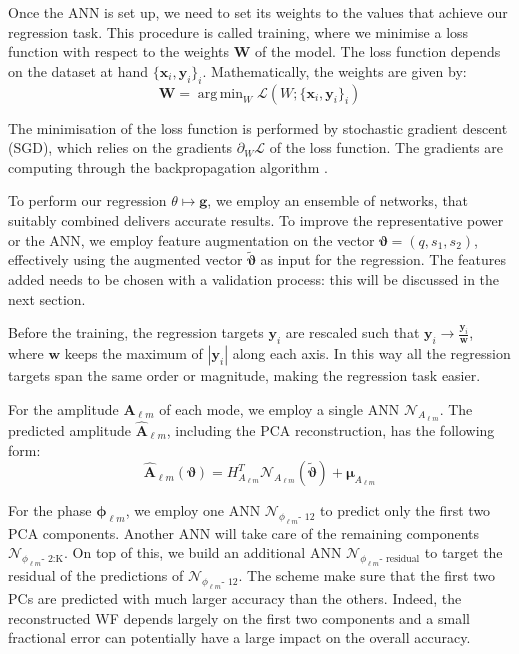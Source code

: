 \documentclass[twocolumn,showpacs,preprintnumbers,nofootinbib,prd,
superscriptaddress,10pt]{revtex4-1}
\DeclareMathOperator*{\argmin}{arg\,min}
\begin{document}
Once the ANN is set up, we need to set its weights to the values that achieve our regression task.
This procedure is called training, where we minimise a loss function with respect to the weights $\boldsymbol{W}$ of the model.
The loss function depends on the dataset at hand ${\{\boldsymbol{x}_i, \boldsymbol{y}_i\}_i}$.
Mathematically, the weights are given by:
%
\begin{equation}\label{eq:loss_general}
	\boldsymbol{W} = \argmin_W \mathcal{L}(W; \{\boldsymbol{x}_i, \boldsymbol{y}_i\}_i)
\end{equation}

The minimisation of the loss function is performed by stochastic gradient descent (SGD), which relies on the gradients $\partial_W \mathcal{L}$ of the loss function. The gradients are computing through the backpropagation algorithm \cite{}.

To perform our regression $\theta \longmapsto \boldsymbol{g}$, we employ an ensemble of networks, that suitably combined delivers accurate results.
To improve the representative power or the ANN, we employ feature augmentation on the vector $\boldsymbol{\vartheta} = (q, s_1, s_2)$, effectively using the augmented vector $\tilde{\boldsymbol{\vartheta}}$ as input for the regression. The features added needs to be chosen with a validation process: this will be discussed in the next section.

Before the training, the regression targets $\boldsymbol{y}_i$ are rescaled such that $\boldsymbol{y}_i \rightarrow \frac{\boldsymbol{y}_i}{\boldsymbol{w}}$, where $\boldsymbol{w}$ keeps the maximum of $|\boldsymbol{y}_i|$ along each axis. %
In this way all the regression targets span the same order or magnitude, making the regression task easier.

For the amplitude $\boldsymbol{A}_{\ell m}$ of each mode, we employ a single ANN $\mathcal{N}_{A_{\ell m}}$.
The predicted amplitude $\hat{\boldsymbol{A}}_{\ell m}$, including the PCA reconstruction, has the following form:
\begin{equation}
	\hat{\boldsymbol{A}}_{\ell m}(\boldsymbol{\vartheta}) = H_{A_{\ell m}}^T \mathcal{N}_{A_{\ell m}}(\tilde{\boldsymbol{\vartheta}}) + \boldsymbol{\mu}_{A_{\ell m}}
\end{equation}

For the phase $\boldsymbol{\phi}_{\ell m}$, we employ one ANN $\mathcal{N}_{\phi_{\ell m}\text{- 12}}$ to predict only the first two PCA components.
Another ANN will take care of the remaining components $\mathcal{N}_{\phi_{\ell m}\text{- 2:K}}$.
On top of this, we build an additional ANN $\mathcal{N}_{\phi_{\ell m}\text{- residual}}$ to target the residual of the predictions of $\mathcal{N}_{\phi_{\ell m}\text{- 12}}$.
The scheme make sure that the first two PCs are predicted with much larger accuracy than the others. Indeed, the reconstructed WF depends largely on the first two components and a small fractional error can potentially have a large impact on the overall accuracy.
\end{document}
